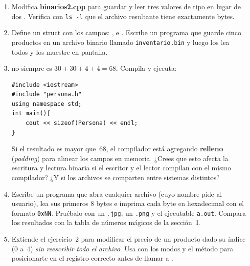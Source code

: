 \documentclass[12pt, oneside]{article}
\begin{document}
\begin{enumerate}

  \item Modifica \textbf{binarios2.cpp} para guardar y leer tres valores
        de tipo  en lugar de dos .  Verifica con
        \texttt{ls -l} que el archivo resultante tiene exactamente
         bytes.

  \item Define un struct  con los campos:
        ,  e .
        Escribe un programa que guarde cinco productos en un archivo
        binario llamado \texttt{inventario.bin} y luego los lea todos y
        los muestre en pantalla.

  \item {} no siempre es $30 + 30 + 4 + 4 = 68$.
        Compila y ejecuta:
        \begin{verbatim}
#include <iostream>
#include "persona.h"
using namespace std;
int main(){
    cout << sizeof(Persona) << endl;
}
        \end{verbatim}
        Si el resultado es mayor que~68, el compilador está agregando
        \textbf{relleno} (\textit{padding}) para alinear los campos en
        memoria.  ¿Crees que esto afecta la escritura y lectura binaria
        si el escritor y el lector compilan con el mismo compilador?
        ¿Y si los archivos se comparten entre sistemas distintos?

  \item Escribe un programa que abra cualquier archivo (cuyo nombre pide
        al usuario), lea sus primeros 8 bytes e imprima cada byte en
        hexadecimal con el formato \texttt{0xNN}.  Pruébalo con un
        \texttt{.jpg}, un \texttt{.png} y el ejecutable \texttt{a.out}.
        Compara los resultados con la tabla de números mágicos de la
        sección~1.

  \item Extiende el ejercicio~2 para modificar el precio de un producto
        dado su índice (0 a~4) \textit{sin reescribir todo el archivo}.
        Usa  con los modos
         y el método
         para posicionarte en el registro correcto antes de
        llamar a .

\end{enumerate}

\end{document}
